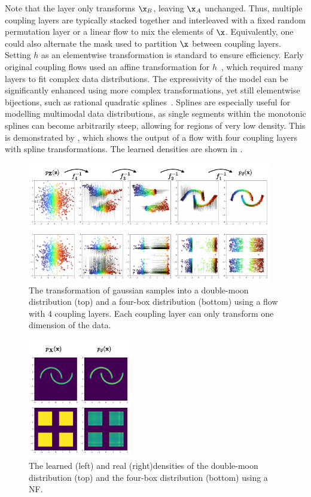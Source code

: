 Note that the layer only transforms $\x_B$, leaving $\x_A$ unchanged.
Thus, multiple coupling layers are typically stacked together and interleaved with a fixed random permutation layer or a linear flow to mix the elements of $\x$.
Equivalently, one could also alternate the mask used to partition $\x$ between coupling layers.
Setting $h$ as an elementwise transformation is standard to ensure efficiency.
Early original coupling flows used an affine transformation for $h$~\cite{RealNVP}, which required many layers to fit complex data distributions.
The expressivity of the model can be significantly enhanced using more complex transformations, yet still elementwise bijections, such as rational quadratic splines~\cite{NeuralSplineFlows}.
Splines are especially useful for modelling multimodal data distributions, as single segments within the monotonic splines can become arbitrarily steep, allowing for regions of very low density.
This is demonstrated by , which shows the output of a flow with four coupling layers with spline transformations.
The learned densities are shown in .

\begin{figure}[ht]
    \centering
    \includegraphics[width=0.95\textwidth]{Figures/generative_models/samples.pdf}
    \caption{The transformation of gaussian samples into a double-moon distribution (top) and a four-box distribution (bottom) using a flow with 4 coupling layers. Each coupling layer can only transform one dimension of the data.}
    \label{fig:samples}
\end{figure}

\begin{figure}[ht]
    \centering
    \includegraphics[width=0.4\textwidth]{Figures/generative_models/densities.pdf}
    \caption{The learned (left) and real (right)densities of the double-moon distribution (top) and the four-box distribution (bottom) using a NF.}
    \label{fig:density}
\end{figure}

